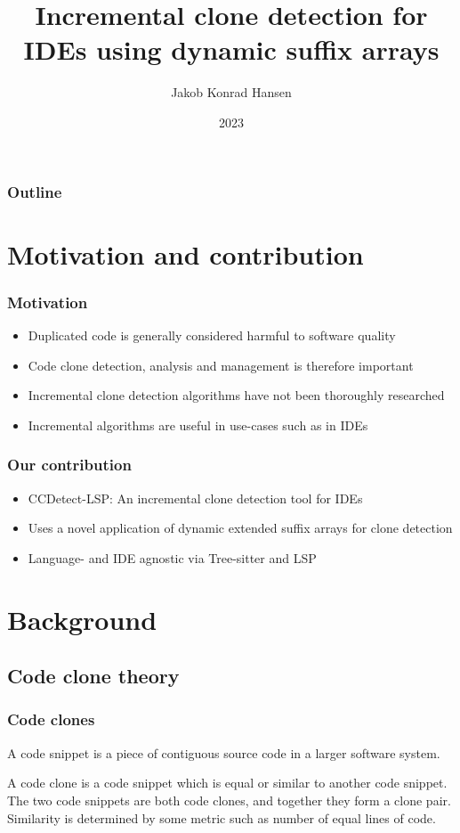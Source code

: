 \documentclass[aspectratio=1610, xcolor=table]{beamer}
\title{Incremental clone detection for IDEs using dynamic suffix arrays}
\author{Jakob Konrad Hansen}
\institute{University of Oslo}
\date{2023}
\begin{document}
\frame{\titlepage}

\begin{frame}
    \frametitle{Outline}
    \tableofcontents
\end{frame}

\section{Motivation and contribution}

\begin{frame}
\frametitle{Motivation}
\begin{itemize}
    \item Duplicated code is generally considered harmful to software quality
    \item Code clone detection, analysis and management is therefore important
    \item Incremental clone detection algorithms have not been thoroughly researched
    \item Incremental algorithms are useful in use-cases such as in IDEs
\end{itemize}
\end{frame}

\begin{frame}
\frametitle{Our contribution}
\begin{itemize}
    \item CCDetect-LSP: An incremental clone detection tool for IDEs
    \item Uses a novel application of dynamic extended suffix arrays for clone detection
    \item Language- and IDE agnostic via Tree-sitter and LSP
\end{itemize}
\end{frame}

\section{Background}

\subsection{Code clone theory}

\begin{frame}
    \frametitle{Code clones}

    \begin{definition}
        A code snippet is a piece of contiguous source code in a larger software system.
    \end{definition}

    \begin{definition}
        A code clone is a code snippet which is equal or similar to another code snippet. The two
        code snippets are both code clones, and together they form a clone pair.
        Similarity is determined by some metric such as number of equal lines of code.
    \end{definition}
\end{frame}
\end{document}

